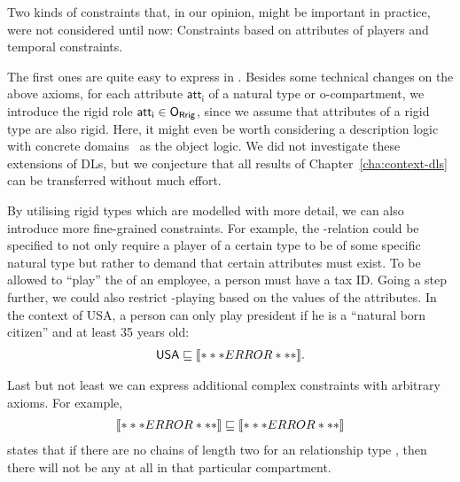 
Two kinds of constraints that, in our opinion, might be important in practice, were not considered
until now: Constraints based on attributes of players and temporal constraints.

The first ones are quite easy to express in \LMLO. Besides some technical changes on the above
axioms, for each attribute $\mathsf{att_{i}}$ of a natural type or o-compartment, we introduce the
rigid role $\mathsf{att_{i}}\in\ORR$, since we assume that attributes of a rigid type are also
rigid.  Here, it might even be worth considering a description logic with concrete
domains~\cite{Lutz-PHD02,Lut-AiML02} as the object logic. We did not investigate these extensions of
DLs, but we conjecture that all results of Chapter~\ref{cha:context-dls} can be transferred without
much effort.

By utilising rigid types which are modelled with more detail, we can also introduce more fine-grained
constraints. For example, the \fills-relation could be specified to not only require a player of a
certain \rosirole type to be of some specific natural type but rather to demand that certain
attributes must exist. To be allowed to ``play'' the \rosirole of an employee, a person must have a
tax ID. Going a step further, we could also restrict \rosirole-playing based on the values of the
attributes. In the context of USA, a person can only play president if he is a ``natural born
citizen'' and at least 35 years old:
\begin{align*}
  \mathsf{USA} \sqsubseteq\oax{\exists\plays.\mathsf{President} \sqsubseteq \mathsf{Person} \sqcap
  \exists \mathsf{natural\_born\_citizen}.\{\true\} \sqcap \exists\mathsf{age \geq_{35}}}.
\end{align*}

Last but not least we can express additional complex constraints with arbitrary \LMLO axioms. For
example,
\begin{align*}
  \oax{\exists\rst.(\exists\rst.\top)\sqsubseteq\bot} \sqsubseteq \oax{\exists\rst.\top\sqsubseteq\bot}
\end{align*}
states that if there are no chains of length two for an relationship type \rst, then there will not
be any \rst at all in that particular compartment.


